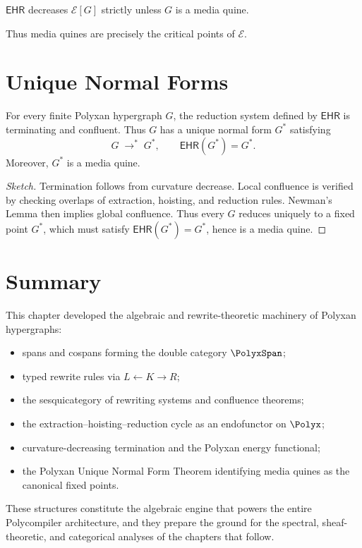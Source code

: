 \begin{theorem}
$\mathsf{EHR}$ decreases $\mathcal{E}[G]$ strictly unless $G$ is a media quine.
\end{theorem}

Thus media quines are precisely the critical points of $\mathcal{E}$.

\section{Unique Normal Forms}

\begin{theorem}
For every finite Polyxan hypergraph $G$, the reduction system defined by
$\mathsf{EHR}$ is terminating and confluent.  
Thus $G$ has a unique normal form $G^\ast$ satisfying
\[
G \;\to^\ast\; G^\ast,
\qquad
\mathsf{EHR}(G^\ast) = G^\ast.
\]
Moreover, $G^\ast$ is a media quine.
\end{theorem}

\begin{proof}[Sketch]
Termination follows from curvature decrease.  
Local confluence is verified by checking overlaps of extraction, hoisting, and
reduction rules.  
Newman's Lemma then implies global confluence.  
Thus every $G$ reduces uniquely to a fixed point $G^\ast$, which must satisfy
$\mathsf{EHR}(G^\ast)=G^\ast$, hence is a media quine.
\end{proof}

\section{Summary}

This chapter developed the algebraic and rewrite-theoretic machinery of Polyxan
hypergraphs:
\begin{itemize}
  \item spans and cospans forming the double category $\PolyxSpan$;
  \item typed rewrite rules via $L\leftarrow K\to R$;
  \item the sesquicategory of rewriting systems and confluence theorems;
  \item the extraction--hoisting--reduction cycle as an endofunctor on $\Polyx$;
  \item curvature-decreasing termination and the Polyxan energy functional;
  \item the Polyxan Unique Normal Form Theorem identifying media quines as the
        canonical fixed points.
\end{itemize}

These structures constitute the algebraic engine that powers the entire
Polycompiler architecture, and they prepare the ground for the spectral,
sheaf-theoretic, and categorical analyses of the chapters that follow.
